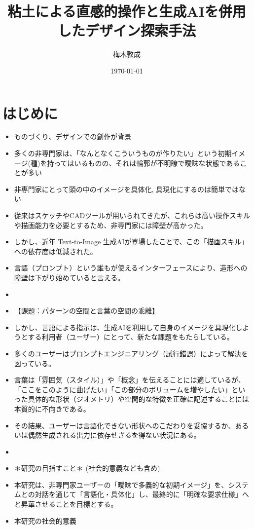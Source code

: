 \documentclass[dvipdfmx]{jlreq}
\title{粘土による直感的操作と生成AIを併用したデザイン探索手法}
\author{梅木敦成}
\date{\today}
\begin{document}
\maketitle


\section{はじめに}
\begin{itemize}
  \item ものづくり、デザインでの創作が背景
  \item 多くの非専門家は、「なんとなくこういうものが作りたい」という初期イメージ(種)を持ってはいるものの、それは輪郭が不明瞭で曖昧な状態であることが多い
  \item 非専門家にとって頭の中のイメージを具体化, 具現化にするのは簡単ではない
  \item 従来はスケッチやCADツールが用いられてきたが、これらは高い操作スキルや描画能力を必要とするため、非専門家には障壁が高かった。
  \item しかし、近年 Text-to-Image 生成AIが登場したことで、この「描画スキル」への依存度は低減された。 
  \item 言語（プロンプト）という誰もが使えるインターフェースにより、造形への障壁は下がり始めていると言える。
  \item 
  \item 【課題：パターンの空間と言葉の空間の乖離】
  \item しかし、言語による指示は、生成AIを利用して自身のイメージを具現化しようとする利用者（ユーザー）にとって、新たな課題をもたらしている。
  \item 多くのユーザーはプロンプトエンジニアリング（試行錯誤）によって解決を図っている。
  \item 言葉は「雰囲気（スタイル）」や「概念」を伝えることには適しているが、「ここをこのように曲げたい」「この部分のボリュームを増やしたい」といった具体的な形状（ジオメトリ）や空間的な特徴を正確に記述することには本質的に不向きである。
  \item その結果、ユーザーは言語化できない形状へのこだわりを妥協するか、あるいは偶然生成される出力に依存せざるを得ない状況にある。
  \item 
  \item ＊研究の目指すこと＊ (社会的意義なども含め)
  \item 本研究は、非専門家ユーザーの「曖昧で多義的な初期イメージ」を、システムとの対話を通じて「言語化・具体化」し、最終的に「明確な要求仕様」へと昇華させることを目標とする。
  \item 本研究の社会的意義

\end{itemize}
\end{document}
